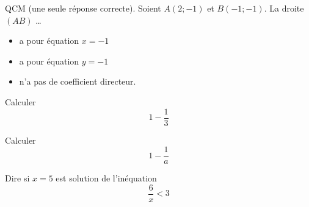 \begin{MentalActivity}

\begin{mental}
            QCM (une seule réponse correcte). Soient \( A(2;-1)\) et \( B(-1;-1)\). La droite \( (AB)\) \ldots
            \begin{itemize}
                \item
                    a pour équation \( x=-1\)
                \item
                    a pour équation \( y=-1\)
                \item
                    n'a pas de coefficient directeur.
            \end{itemize}

\end{mental}

\begin{mental}
            Calculer 
            \begin{equation*}
                1- \frac{1}{ 3 }
            \end{equation*}
\end{mental}

\begin{mental}
            Calculer 
            \begin{equation*}
                1- \frac{1}{ a }
            \end{equation*}
\end{mental}

\begin{mental}
            Dire si \( x=5\) est solution de l'inéquation
            \begin{equation}
                \frac{ 6 }{ x }<3
            \end{equation}
\end{mental}
            
\end{MentalActivity}



